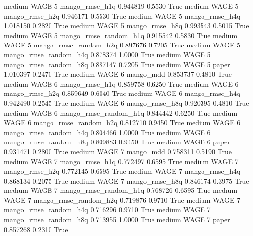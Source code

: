     medium     WAGE                 5        mango_rmse_h1q   0.944819      0.5530    True
    medium     WAGE                 5        mango_rmse_h2q   0.946171      0.5530    True
    medium     WAGE                 5        mango_rmse_h4q   1.018150      0.2820    True
    medium     WAGE                 5        mango_rmse_h8q   0.993543      0.5015    True
    medium     WAGE                 5 mango_rmse_random_h1q   0.915542      0.5830    True
    medium     WAGE                 5 mango_rmse_random_h2q   0.897676      0.7205    True
    medium     WAGE                 5 mango_rmse_random_h4q   0.878374      1.0000    True
    medium     WAGE                 5 mango_rmse_random_h8q   0.887147      0.7205    True
    medium     WAGE                 5                 paper   1.010397      0.2470    True
    medium     WAGE                 6             mango_mdd   0.853737      0.4810    True
    medium     WAGE                 6        mango_rmse_h1q   0.859758      0.6250    True
    medium     WAGE                 6        mango_rmse_h2q   0.859649      0.6040    True
    medium     WAGE                 6        mango_rmse_h4q   0.942490      0.2545    True
    medium     WAGE                 6        mango_rmse_h8q   0.920395      0.4810    True
    medium     WAGE                 6 mango_rmse_random_h1q   0.844442      0.6250    True
    medium     WAGE                 6 mango_rmse_random_h2q   0.812710      0.9450    True
    medium     WAGE                 6 mango_rmse_random_h4q   0.804466      1.0000    True
    medium     WAGE                 6 mango_rmse_random_h8q   0.809883      0.9450    True
    medium     WAGE                 6                 paper   0.931471      0.2800    True
    medium     WAGE                 7             mango_mdd   0.758311      0.5190    True
    medium     WAGE                 7        mango_rmse_h1q   0.772497      0.6595    True
    medium     WAGE                 7        mango_rmse_h2q   0.772145      0.6595    True
    medium     WAGE                 7        mango_rmse_h4q   0.868134      0.2075    True
    medium     WAGE                 7        mango_rmse_h8q   0.846174      0.3975    True
    medium     WAGE                 7 mango_rmse_random_h1q   0.768726      0.6595    True
    medium     WAGE                 7 mango_rmse_random_h2q   0.719876      0.9710    True
    medium     WAGE                 7 mango_rmse_random_h4q   0.716296      0.9710    True
    medium     WAGE                 7 mango_rmse_random_h8q   0.713955      1.0000    True
    medium     WAGE                 7                 paper   0.857268      0.2310    True
